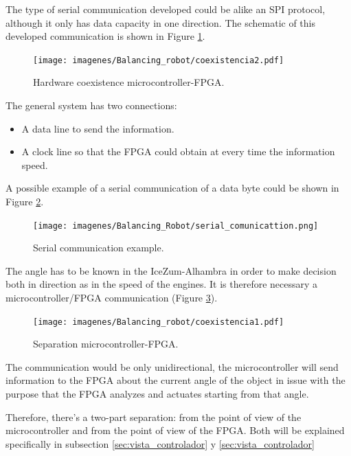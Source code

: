 The type of serial communication developed could be alike an SPI protocol, although it only has data capacity in one direction. The schematic of this developed communication is shown in Figure \ref{fig:coexistencia2}.

\begin{figure}[H]
	\center
	\texttt{[image: imagenes/Balancing\_robot/coexistencia2.pdf]}
	\caption{Hardware coexistence microcontroller-FPGA.}
	\label{fig:coexistencia2}
\end{figure}
The general system has two connections:
\begin{itemize}
	\item A data line to send the information.
	\item A clock line so that the FPGA could obtain at every time the information speed.
\end{itemize}

A possible example of a serial communication of a data byte could be shown in Figure \ref{fig:serial_comunicattion}. 

\begin{center}
	\begin{figure}[H]
		\center
		\texttt{[image: imagenes/Balancing\_Robot/serial\_comunicattion.png]}
		\caption{Serial communication example.}
		\label{fig:serial_comunicattion}
	\end{figure}
\end{center}

The angle has to be known in the IceZum-Alhambra in order to make decision both in direction as in the speed of the engines. It is therefore necessary a microcontroller/FPGA communication (Figure \ref{fig:coexistencia1}).

\begin{figure}[H]
	\center
	\texttt{[image: imagenes/Balancing\_robot/coexistencia1.pdf]}
	\caption{Separation microcontroller-FPGA.}
	\label{fig:coexistencia1}
\end{figure}

The communication would be only unidirectional, the microcontroller will send information to the FPGA about the current angle of the object in issue with the purpose that the FPGA analyzes and actuates starting from that angle.\newline

Therefore, there’s a two-part separation: from the point of view of the microcontroller and from the point of view of the FPGA. Both will be explained specifically in subsection \ref{sec:vista_controlador} y \ref{sec:vista_controlador}

